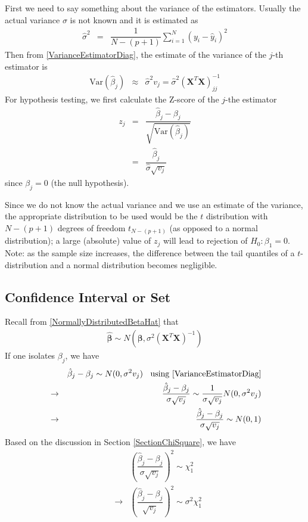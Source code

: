 \documentclass[11pt]{article}
\theoremstyle{remark}
\begin{document}
First we need to say something about the variance of the estimators. Usually the actual variance $\sigma$ is not known and it is estimated as
\begin{eqnarray}
\hat{\sigma}^2 &=&\dfrac{1}{N-(p+1)}\sum_{i=1}^N(y_i-\hat{y}_i)^2
\end{eqnarray}
Then from \eqref{VarianceEstimatorDiag}, the estimate of the variance of the $j$-th estimator is
\begin{eqnarray}
\text{Var}(\hat{\beta}_j) &\approx& \hat{\sigma}^2 v_j = \hat{\sigma}^2 \left(\mathbf{X}^T\mathbf{X}\right)^{-1}_{jj}\label{VarianceEstimatorDiagEstimate}
\end{eqnarray}
For hypothesis testing, we first calculate the Z-score of the $j$-the estimator
\begin{eqnarray}
z_j &=&\dfrac{\hat{\beta}_j - \beta_j}{\sqrt{\text{Var}(\hat{\beta}_j)}}\nonumber\\
&=&\dfrac{\hat{\beta}_j}{\hat{\sigma} \sqrt{v_j}}
\end{eqnarray}
since $\beta_j = 0$ (the null hypothesis).

Since we do not know the actual variance and we use an estimate of the variance, the appropriate distribution to be used would be the $t$ distribution with $N-(p+1)$ degrees of freedom $t_{N-(p+1)}$ (as opposed to a normal distribution); a large (absolute) value of $z_j$ will lead to rejection of $H_0: \beta_1 = 0$. Note: as the sample size increases, the difference between the tail quantiles of a $t$-distribution and a normal distribution becomes negligible.


\subsection{Confidence Interval or Set}
Recall from \eqref{NormallyDistributedBetaHat} that
\begin{eqnarray}
\boldsymbol{\hat{\beta}}\sim N(\boldsymbol{\beta},\sigma^2 \left(\mathbf{X}^T\mathbf{X}\right)^{-1})
\end{eqnarray}
If one isolates $\beta_j$, we have
\begin{eqnarray}
&&\hat{\beta}_j - \beta_j \sim N(0,\sigma^2 v_j )\:\:\:\:\text{using \eqref{VarianceEstimatorDiag}}\nonumber\\
&\rightarrow&\dfrac{\hat{\beta}_j - \beta_j}{\sigma \sqrt{v_j}} \sim \dfrac{1}{\sigma \sqrt{v_j}}N(0,\sigma^2 v_j )\nonumber\\
&\rightarrow&\dfrac{\hat{\beta}_j - \beta_j}{\sigma \sqrt{v_j}} \sim N(0,1)
\end{eqnarray}
Based on the discussion in Section \ref{SectionChiSquare}, we have
\begin{eqnarray}
&&\left(\dfrac{\hat{\beta}_j - \beta_j}{\sigma \sqrt{v_j}}\right)^2 \sim \chi_1^2\nonumber\\
&\rightarrow&\left(\dfrac{\hat{\beta}_j - \beta_j}{\sqrt{v_j}}\right)^2 \sim \sigma^2\chi_1^2
\end{eqnarray}


\end{document}
